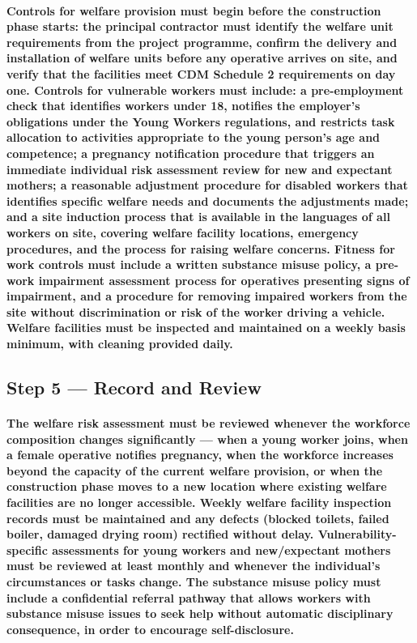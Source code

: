 \paragraph{Controls for welfare provision must begin before the construction phase starts: the principal contractor must identify the welfare unit requirements from the project programme, confirm the delivery and installation of welfare units before any operative arrives on site, and verify that the facilities meet CDM Schedule 2 requirements on day one. Controls for vulnerable workers must include: a pre-employment check that identifies workers under 18, notifies the employer's obligations under the Young Workers regulations, and restricts task allocation to activities appropriate to the young person's age and competence; a pregnancy notification procedure that triggers an immediate individual risk assessment review for new and expectant mothers; a reasonable adjustment procedure for disabled workers that identifies specific welfare needs and documents the adjustments made; and a site induction process that is available in the languages of all workers on site, covering welfare facility locations, emergency procedures, and the process for raising welfare concerns. Fitness for work controls must include a written substance misuse policy, a pre-work impairment assessment process for operatives presenting signs of impairment, and a procedure for removing impaired workers from the site without discrimination or risk of the worker driving a vehicle. Welfare facilities must be inspected and maintained on a weekly basis minimum, with cleaning provided daily.}

\subsection{Step 5 --- Record and Review}
\paragraph{The welfare risk assessment must be reviewed whenever the workforce composition changes significantly --- when a young worker joins, when a female operative notifies pregnancy, when the workforce increases beyond the capacity of the current welfare provision, or when the construction phase moves to a new location where existing welfare facilities are no longer accessible. Weekly welfare facility inspection records must be maintained and any defects (blocked toilets, failed boiler, damaged drying room) rectified without delay. Vulnerability-specific assessments for young workers and new/expectant mothers must be reviewed at least monthly and whenever the individual's circumstances or tasks change. The substance misuse policy must include a confidential referral pathway that allows workers with substance misuse issues to seek help without automatic disciplinary consequence, in order to encourage self-disclosure.}

